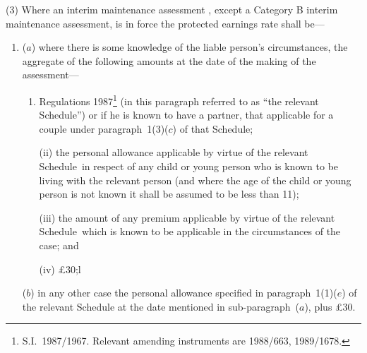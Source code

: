\documentclass[12pt,a4paper]{article}
\begin{document}
(3) Where an interim maintenance assessment%
, except a Category B interim maintenance assessment,  %
is in force the protected earnings rate shall be—
\begin{enumerate}\item[]
($a$) where there is some knowledge of the liable person’s circumstances, the aggregate of the following amounts at the date of the making of the assessment—
\begin{enumerate}\item[]
 Regulations 1987\footnote{\frenchspacing S.I.~1987/1967. Relevant amending instruments are 1988/663, 1989/1678.} (in this paragraph referred to as “the relevant Schedule”) or if he is known to have a partner, that applicable for a couple under paragraph~1(3)($c$) of that Schedule;

(ii) the personal allowance applicable by virtue of the relevant Schedule~in respect of any child or young person who is known to be living with the relevant person (and where the age of the child or young person is not known it shall be assumed to be less than 11);

(iii) the amount of any premium applicable by virtue of the relevant Schedule~which is known to be applicable in the circumstances of the case; and

(iv) £30;l
\end{enumerate}

\begin{sloppypar}
($b$) in any other case the personal allowance specified in paragraph~1(1)($e$) of the relevant Schedule at the date mentioned in sub-\hspace{0pt}paragraph~($a$), plus £30.
\end{sloppypar}
\end{enumerate}
\end{document}
